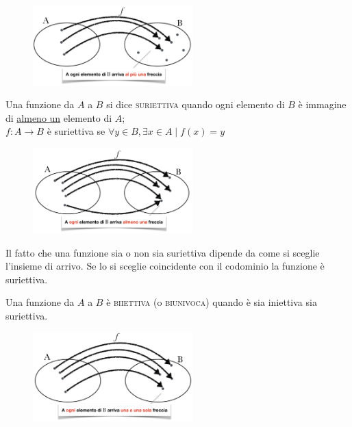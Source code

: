 \begin{figure}[htpb!]
  \centering
  \includegraphics[width=0.55\textwidth]{img/3_funz.png}
\end{figure}

\begin{definizione}
Una funzione da \(A\) a \(B\) si dice \textsc{suriettiva} quando ogni elemento di 
\(B\) è immagine di \underline{almeno un} elemento di \(A\);\\

\(f: A\to B\) è suriettiva se \(\forall y\in B, \exists x\in A \mid f(x)=y\)
\end{definizione}

\begin{figure}[htpb!]
  \centering
  \includegraphics[width=0.55\textwidth]{img/4_funz.png}
\end{figure}

Il fatto che una funzione sia o non sia suriettiva dipende da come si sceglie 
l'insieme di arrivo. Se lo si sceglie coincidente con il codominio la 
funzione è suriettiva.\\
%
\begin{definizione}
Una funzione da \(A\) a \(B\) è \textsc{biiettiva} (o \textsc{biunivoca}) quando 
è sia iniettiva sia suriettiva.\\
\end{definizione}

\begin{figure}[htpb!]
  \centering
  \includegraphics[width=0.55\textwidth]{img/5_funz.png}
\end{figure}

